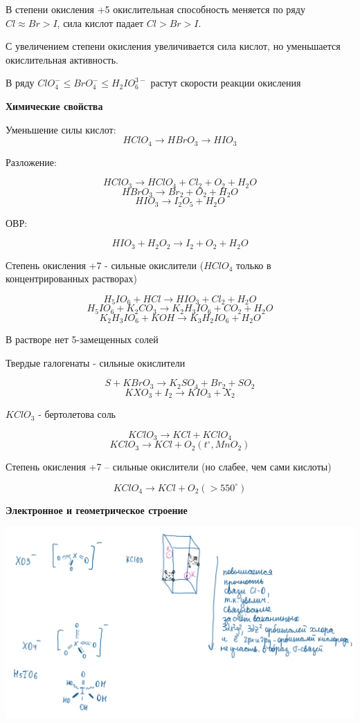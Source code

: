 \documentclass[14pt,a4paper]{scrartcl}
\begin{document}
В степени окисления +5 окислительная способность меняется по ряду $Cl\approx Br > I$, сила кислот падает $Cl>Br>I$.

С увеличением степени окисления увеличивается сила кислот, но уменьшается окислительная активность.

В ряду $ClO_4^-\leq BrO_4^- \leq H_2IO_6^{3-}$ растут скорости реакции окисления

\textbf{Химические свойства}

Уменьшение силы кислот:
$$HClO_4 \rightarrow HBrO_3 \rightarrow HIO_3$$

Разложение:

$$HClO_3 \rightarrow HClO_4 + Cl_2 + O_2 + H_2O$$
$$HBrO_3 \rightarrow Br_2 + O_2 + H_2O$$
$$HIO_3 \rightarrow I_2O_5 + H_2O$$

ОВР: 

$$HIO_3 + H_2O_2 \rightarrow I_2 + O_2 + H_2O$$

Степень окисления +7 - сильные окислители ($HClO_4$ только в концентрированных растворах)

$$H_5IO_6 + HCl \rightarrow HIO_3 + Cl_2 + H_2O$$
$$H_5IO_6 + K_2CO_3 \rightarrow K_2H_3IO_6 + CO_2 + H_2O$$
$$K_2H_3IO_6 + KOH \rightarrow K_3H_2IO_6 + H_2O$$

В растворе нет 5-замещенных солей

Твердые галогенаты - сильные окислители

$$S + KBrO_3 \rightarrow K_2SO_4 + Br_2 + SO_2$$
$$KXO_3 + I_2 \rightarrow KIO_3 + X_2$$
 
$KClO_3$ - бертолетова соль

$$KClO_3 \rightarrow KCl + KClO_4$$
$$KClO_3 \rightarrow KCl + O_2 (t^{\circ}, MnO_2)$$

Степень окисления +7 -- сильные окислители (но слабее, чем сами кислоты)

$$KClO_4 \rightarrow KCl + O_2 (>550^{\circ})$$

\textbf{Электронное и геометрическое строение}

\includegraphics[scale=0.7]{5v5.png}
\end{document}
